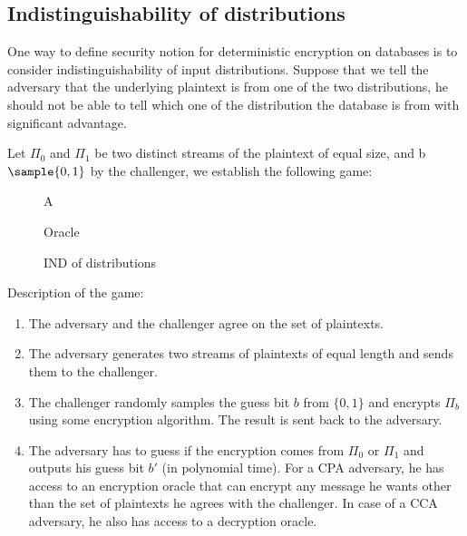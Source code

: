 \documentclass[10pt]{article}
\begin{document}
\subsection{Indistinguishability of distributions}
One way to define security notion for deterministic encryption on databases is to consider indistinguishability of input distributions. Suppose that we tell the adversary that the underlying plaintext is from one of the two distributions, he should not be able to tell which one of the distribution the database is from with significant advantage.

Let $\Pi_0$ and $\Pi_1$ be two distinct streams of the plaintext of equal size, and b $\sample \{0,1\}$ by the challenger, we establish the following game:

\begin{figure}[H]
\begin{center}
\begin{bbrenv}{A}
\begin{bbrbox}[name = Adversary, minheight=3.5cm, minwidth = 2.5cm]
\end{bbrbox}

\bbrmsgspace{1cm}
\bbrmsgspace{1cm}


\begin{bbroracle}{Oracle}
\begin{bbrbox}[name = Encryption, minheight = 1cm]
\end{bbrbox}
\end{bbroracle}
\bbroracleqryspace{0.1cm}
\bbroracleqryspace{0.5cm}
\end{bbrenv}

\caption{IND of distributions}
\end{center}
\end{figure}

Description of the game:
\begin{enumerate}
\item The adversary and the challenger agree on the set of plaintexts.
\item The adversary generates two streams of plaintexts of equal length and sends them to the challenger.
\item The challenger randomly samples the guess bit $b$ from $\{0,1\}$ and encrypts $\Pi_b$ using some encryption algorithm. The result is sent back to the adversary.
\item The adversary has to guess if the encryption comes from $\Pi_0$ or $\Pi_1$ and outputs his guess bit $b'$ (in polynomial time). For a CPA adversary, he has access to an encryption oracle that can encrypt any message he wants other than the set of plaintexts he agrees with the challenger. In case of a CCA adversary, he also has access to a decryption oracle.
\end{enumerate}
\end{document}
